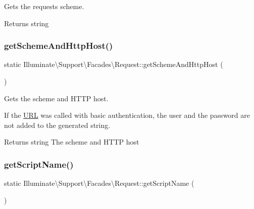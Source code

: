 Gets the request\textquotesingle{}s scheme.

\begin{DoxyReturn}{Returns}
string 
\end{DoxyReturn}
\mbox{\label{class_illuminate_1_1_support_1_1_facades_1_1_request_a6576e102a6c46aaf0a0167c7b45a51f5}} 
\subsubsection{\texorpdfstring{get\+Scheme\+And\+Http\+Host()}{getSchemeAndHttpHost()}}
{\footnotesize\ttfamily static Illuminate\textbackslash{}\+Support\textbackslash{}\+Facades\textbackslash{}\+Request\+::get\+Scheme\+And\+Http\+Host (\begin{DoxyParamCaption}{ }\end{DoxyParamCaption})\hspace{0.3cm}{\ttfamily [static]}}

Gets the scheme and H\+T\+TP host.

If the \mbox{\hyperlink{class_illuminate_1_1_support_1_1_facades_1_1_u_r_l}{U\+RL}} was called with basic authentication, the user and the password are not added to the generated string.

\begin{DoxyReturn}{Returns}
string The scheme and H\+T\+TP host 
\end{DoxyReturn}
\mbox{\label{class_illuminate_1_1_support_1_1_facades_1_1_request_abbaae1eb9e945968ecf88a6028fdad1d}} 
\subsubsection{\texorpdfstring{get\+Script\+Name()}{getScriptName()}}
{\footnotesize\ttfamily static Illuminate\textbackslash{}\+Support\textbackslash{}\+Facades\textbackslash{}\+Request\+::get\+Script\+Name (\begin{DoxyParamCaption}{ }\end{DoxyParamCaption})\hspace{0.3cm}{\ttfamily [static]}}

